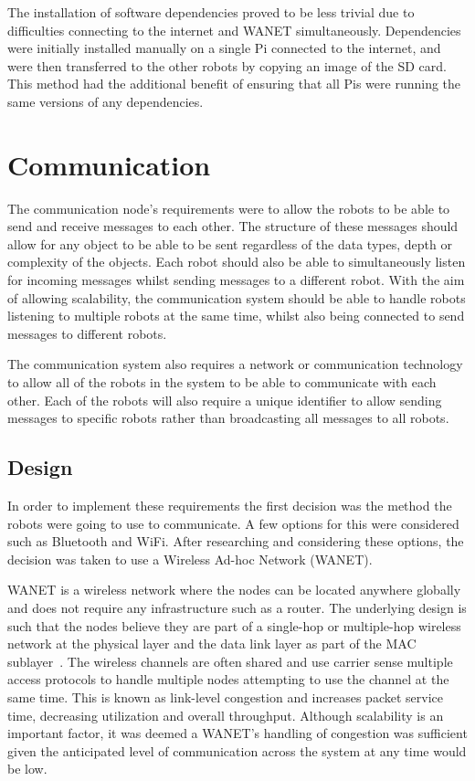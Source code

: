 The installation of software dependencies proved to be less trivial due to
difficulties connecting to the internet and WANET simultaneously.
Dependencies were initially installed manually on a single Pi connected to
the internet, and were then transferred to the other robots by copying an
image of the SD card. This method had the additional benefit of ensuring
that all Pis were running the same versions of any dependencies.

\section{Communication}\label{soft/comms}
The communication node's requirements were to allow the robots to
be able to send and receive messages to each other. The structure
of these messages should allow for any object to be able to be sent
regardless of the data types, depth or complexity of the objects.
Each robot should also be able to simultaneously listen for
incoming messages whilst sending messages to a different robot.
With the aim of allowing scalability, the communication system
should be able to handle robots listening to multiple robots at the
same time, whilst also being connected to send messages to different
robots.

The communication system also requires a network or communication
technology to allow all of the robots in the system to be able to
communicate with each other. Each of the robots will also require
a unique identifier to allow sending messages to specific robots
rather than broadcasting all messages to all robots.

\subsection{Design}\label{soft/comms/design}
In order to implement these requirements the first decision was the
method the robots were going to use to communicate. A few options
for this were considered such as Bluetooth and WiFi. After
researching and considering these options, the decision was taken
to use a Wireless Ad-hoc Network (WANET).

WANET is a wireless network where the nodes can be located anywhere
globally and does not require any infrastructure such as a router. The underlying design is such that the nodes believe
they are part of a single-hop or multiple-hop wireless network at the
physical layer and the data link layer as part of the MAC sublayer~\cite{rajesh2015congestion}. The wireless channels are often shared
and use carrier sense multiple access protocols to handle multiple
nodes attempting to use the channel at the same time. This is known
as link-level congestion and increases packet service time,
decreasing utilization and overall throughput. Although scalability
is an important factor, it was deemed a WANET's handling of
congestion was sufficient given the anticipated level of
communication across the system at any time would be low.

